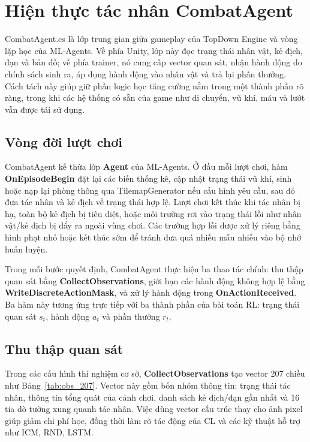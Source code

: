 \section{Hiện thực tác nhân CombatAgent}

CombatAgent.cs là lớp trung gian giữa gameplay của TopDown Engine và vòng lặp học của ML-Agents. Về phía Unity, lớp này đọc trạng thái nhân vật, kẻ địch, đạn và bản đồ; về phía trainer, nó cung cấp vector quan sát, nhận hành động do chính sách sinh ra, áp dụng hành động vào nhân vật và trả lại phần thưởng. Cách tách này giúp giữ phần logic học tăng cường nằm trong một thành phần rõ ràng, trong khi các hệ thống có sẵn của game như di chuyển, vũ khí, máu và lướt vẫn được tái sử dụng.

\subsection{Vòng đời lượt chơi}

CombatAgent kế thừa lớp \textbf{Agent} của ML-Agents. Ở đầu mỗi lượt chơi, hàm \textbf{OnEpisodeBegin} đặt lại các biến thống kê, cập nhật trạng thái vũ khí, sinh hoặc nạp lại phòng thông qua TilemapGenerator nếu cấu hình yêu cầu, sau đó đưa tác nhân và kẻ địch về trạng thái hợp lệ. Lượt chơi kết thúc khi tác nhân bị hạ, toàn bộ kẻ địch bị tiêu diệt, hoặc môi trường rơi vào trạng thái lỗi như nhân vật/kẻ địch bị đẩy ra ngoài vùng chơi. Các trường hợp lỗi được xử lý riêng bằng hình phạt nhỏ hoặc kết thúc sớm để tránh đưa quá nhiều mẫu nhiễu vào bộ nhớ huấn luyện.

Trong mỗi bước quyết định, CombatAgent thực hiện ba thao tác chính: thu thập quan sát bằng \textbf{CollectObservations}, giới hạn các hành động không hợp lệ bằng \textbf{WriteDiscreteActionMask}, và xử lý hành động trong \textbf{OnActionReceived}. Ba hàm này tương ứng trực tiếp với ba thành phần của bài toán RL: trạng thái quan sát $s_t$, hành động $a_t$ và phần thưởng $r_t$.

\subsection{Thu thập quan sát}

Trong các cấu hình thí nghiệm cơ sở, \textbf{CollectObservations} tạo vector 207 chiều như Bảng~\ref{tab:obs_207}. Vector này gồm bốn nhóm thông tin: trạng thái tác nhân, thông tin tổng quát của cảnh chơi, danh sách kẻ địch/đạn gần nhất và 16 tia dò tường xung quanh tác nhân. Việc dùng vector cấu trúc thay cho ảnh pixel giúp giảm chi phí học, đồng thời làm rõ tác động của CL và các kỹ thuật hỗ trợ như ICM, RND, LSTM.

